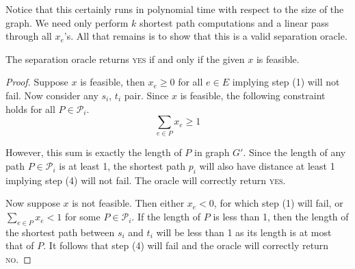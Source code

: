 \noindent{}
\vspace{1em}

Notice that this certainly runs in polynomial time with respect to the size of the graph. We need only perform $k$ shortest path computations and a linear pass through all $x_e$'s. All that remains is to show that this is a valid separation oracle.

\begin{claim}
The separation oracle returns \textsc{yes} if and only if the given $x$ is feasible.
\end{claim}
\begin{proof}
Suppose $x$ is feasible, then $x_e \geq 0$ for all $e \in E$ implying step (1) will not fail. Now consider any $s_i$, $t_i$ pair. Since $x$ is feasible, the following constraint holds for all $P \in \mathcal{P}_i$.
\begin{equation*}
\sum_{e \in P} x_e \geq 1
\end{equation*}

However, this sum is exactly the length of $P$ in graph $G'$. Since the length of any path $P \in \mathcal{P}_i$ is at least 1, the shortest path $p_i$ will also have distance at least 1 implying step (4) will not fail. The oracle will correctly return \textsc{yes}.

Now suppose $x$ is not feasible. Then either $x_e < 0$, for which step (1) will fail, or $\sum_{e \in P} x_e < 1$ for some $P \in \mathcal{P}_i$. If the length of $P$ is less than 1, then the length of the shortest path between $s_i$ and $t_i$ will be less than 1 as its length is at most that of $P$. It follows that step (4) will fail and the oracle will correctly return \textsc{no}.
\end{proof}
